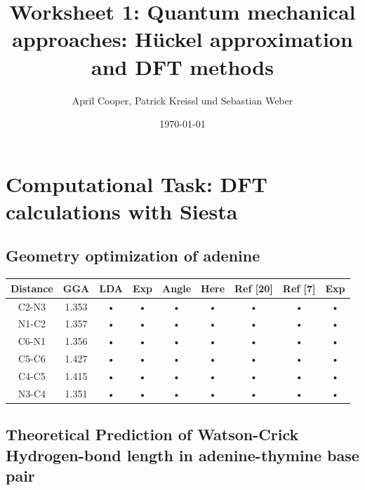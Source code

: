 \documentclass[12pt,a4paper]{scrartcl}
\author{April Cooper, Patrick Kreissl und Sebastian Weber}
\title{Worksheet 1: Quantum mechanical approaches:
Hückel approximation and DFT methods}
\date{\today}
\begin{document}
\maketitle
\tableofcontents
\newpage

\section{Computational Task: DFT calculations with Siesta}

\subsection{Geometry optimization of adenine}

\begin{tabular}{|c|c|c|c||c|c|c|c|c|}
\hline 
Distance & GGA & LDA & Exp & Angle & Here & Ref [20] & Ref [7] & Exp \\ 
\hline 
C2-N3 & 1.353 & • & • & • & • & • & • & • \\ 
\hline 
N1-C2 & 1.357 & • & • & • & • & • & • & • \\ 
\hline 
C6-N1 & 1.356 & • & • & • & • & • & • & • \\ 
\hline 
C5-C6 & 1.427 & • & • & • & • & • & • & • \\ 
\hline 
C4-C5 & 1.415 & • & • & • & • & • & • & • \\ 
\hline 
N3-C4 & 1.351 & • & • & • & • & • & • & • \\ 
\hline 
\end{tabular} 

\newpage

\subsection{Theoretical Prediction of Watson-Crick Hydrogen-bond length in
adenine-thymine base pair}
\end{document}
